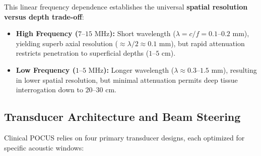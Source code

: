 \documentclass[11pt,a4paper]{article}
\begin{document}
This linear frequency dependence establishes the universal \textbf{spatial resolution versus depth trade-off}:
\begin{itemize}[leftmargin=2em]
    \item \textbf{High Frequency ($7\text{--}15\text{ MHz}$):} Short wavelength ($\lambda = c/f = 0.1\text{--}0.2\text{ mm}$), yielding superb axial resolution ($\approx \lambda/2 \approx 0.1\text{ mm}$), but rapid attenuation restricts penetration to superficial depths ($1\text{--}5\text{ cm}$).
    \item \textbf{Low Frequency ($1\text{--}5\text{ MHz}$):} Longer wavelength ($\lambda \approx 0.3\text{--}1.5\text{ mm}$), resulting in lower spatial resolution, but minimal attenuation permits deep tissue interrogation down to $20\text{--}30\text{ cm}$.
\end{itemize}

\subsection{Transducer Architecture and Beam Steering}
Clinical POCUS relies on four primary transducer designs, each optimized for specific acoustic windows:
\end{document}
